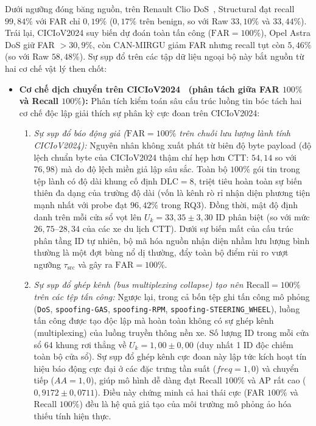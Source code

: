 \documentclass[12pt, a4paper, reqno, oneside]{book}
\DeclareRobustCommand{\code}[1]{\nolinkurl{#1}}
\begin{document}
Dưới ngưỡng đóng băng nguồn, trên Renault Clio DoS~\cite{dupont2019automotive}, Structural đạt recall $99{,}84\%$ với FAR chỉ $0{,}19\%$ ($0{,}17\%$ trên benign, so với Raw $33{,}10\%$ và $33{,}44\%$). Trái lại, CICIoV2024 suy biến dự đoán toàn tấn công ($\text{FAR}=100\%$), Opel Astra DoS giữ FAR $>30{,}9\%$, còn CAN-MIRGU giảm FAR nhưng recall tụt còn $5{,}46\%$ (so với Raw $58{,}48\%$). Sự sụp đổ trên các tập dữ liệu ngoại bộ này bắt nguồn từ hai cơ chế vật lý then chốt:
\begin{itemize}
    \item \textbf{Cơ chế dịch chuyển trên CICIoV2024~\cite{neto2024ciciov2024} (phân tách giữa FAR $100\%$ và Recall $100\%$):} Phân tích kiểm toán sâu cấu trúc luồng tin bóc tách hai cơ chế độc lập giải thích sự phân kỳ cực đoan trên CICIoV2024:
    \begin{enumerate}
        \item \textit{Sự sụp đổ báo động giả ($\text{FAR}=100\%$ trên chuỗi lưu lượng lành tính CICIoV2024):} Nguyên nhân không xuất phát từ biên độ byte payload (độ lệch chuẩn byte của CICIoV2024 thậm chí hẹp hơn CTT: $54{,}14$ so với $76{,}98$) mà do độ lệch miền giả lập sâu sắc. Toàn bộ $100\%$ gói tin trong tệp lành có độ dài khung cố định $\text{DLC} = 8$, triệt tiêu hoàn toàn sự biến thiên đa dạng của trường độ dài (vốn là kênh rò rỉ nhận diện phương tiện mạnh nhất với probe đạt $96{,}42\%$ trong RQ3). Đồng thời, mật độ định danh trên mỗi cửa sổ vọt lên $U_k = 33{,}35 \pm 3{,}30$ ID phân biệt (so với mức $26{,}75\text{--}28{,}34$ của các xe du lịch CTT). Dưới sự biến mất của cấu trúc phân tầng ID tự nhiên, bộ mã hóa nguồn nhận diện nhầm lưu lượng bình thường là một đợt bùng nổ dị thường, đẩy toàn bộ điểm rủi ro vượt ngưỡng $\tau_{\text{src}}$ và gây ra $\text{FAR} = 100\%$.
        \item \textit{Sự sụp đổ ghép kênh (bus multiplexing collapse) tạo nên $\text{Recall}=100\%$ trên các tệp tấn công:} Ngược lại, trong cả bốn tệp ghi tấn công mô phỏng (\code{DoS}, \code{spoofing-GAS}, \code{spoofing-RPM}, \code{spoofing-STEERING_WHEEL}), luồng tấn công được tạo độc lập mà hoàn toàn không có sự ghép kênh (multiplexing) của luồng truyền thông nền xe. Số lượng ID trong mỗi cửa sổ 64 khung rơi thẳng về $U_k = 1{,}00 \pm 0{,}00$ (duy nhất 1 ID độc chiếm toàn bộ cửa sổ). Sự sụp đổ ghép kênh cực đoan này lập tức kích hoạt tín hiệu báo động cực đại ở các đặc trưng tần suất ($freq=1{,}0$) và chuyển tiếp ($AA=1{,}0$), giúp mô hình dễ dàng đạt Recall $100\%$ và AP rất cao ($0{,}9172 \pm 0{,}0711$). Điều này chứng minh cả hai thái cực (FAR $100\%$ và Recall $100\%$) đều là hệ quả giả tạo của môi trường mô phỏng ảo hóa thiếu tính hiện thực.

\end{enumerate}
\end{itemize}
\end{document}
